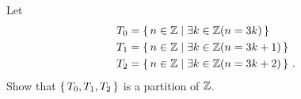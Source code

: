 \guard



\begin{exercise}
\label{exercise:paritionOfIntegers}
  Let
  \begin{align*}
    T_0 &= \left\{\,n\in\mathbb{Z} \mid \exists k\in\mathbb{Z}(n=3k)\,\right\} \\
    T_1 &= \left\{\,n\in\mathbb{Z} \mid \exists k\in\mathbb{Z}(n=3k+1)\,\right\} \\
    T_2 &= \left\{\,n\in\mathbb{Z} \mid \exists k\in\mathbb{Z}(n=3k+2)\,\right\} \,.
  \end{align*}
  Show that $\left\{\, T_0, T_1, T_2\,\right\}$ is a partition of $\mathbb{Z}$.
\end{exercise}
